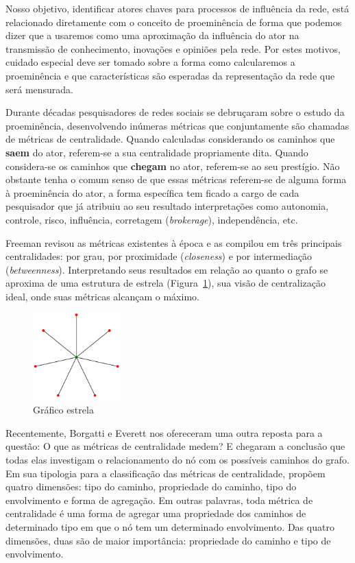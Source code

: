 \documentclass{article}
\begin{document}
Nosso objetivo, identificar atores chaves para processos de influência da rede,
está relacionado diretamente com o conceito de proeminência de forma que podemos
dizer que a usaremos como uma aproximação da influência do ator na transmissão de
conhecimento, inovações e opiniões pela rede. Por estes motivos, cuidado especial
deve ser tomado sobre a forma como calcularemos a proeminência e que
características são esperadas da representação da rede que será mensurada.

Durante décadas pesquisadores de redes sociais se debruçaram sobre o estudo da
proeminência, desenvolvendo inúmeras métricas que conjuntamente são chamadas de
métricas de centralidade. Quando calculadas considerando os caminhos que
\textbf{saem} do ator, referem-se a sua centralidade propriamente dita. Quando
considera-se os caminhos que \textbf{chegam} no ator, referem-se ao seu
prestígio. Não obstante tenha o comum senso de que essas métricas referem-se de
alguma forma à proeminência do ator, a forma específica tem ficado a cargo de
cada pesquisador que já atribuiu ao seu resultado interpretações como autonomia,
controle, risco, influência, corretagem (\textit{brokerage}), independência,
etc.

Freeman revisou as métricas existentes à época \cite{Freeman1979} e as compilou
em três principais centralidades: por grau, por proximidade (\textit{closeness})
e por intermediação (\textit{betweenness}). Interpretando seus resultados em
relação ao quanto o grafo se aproxima de uma estrutura de estrela
(Figura~\ref{fig:star}), sua visão de centralização ideal, onde suas métricas
alcançam o máximo.

\begin{figure}[h!]
  \caption{Gráfico estrela}
  \label{fig:star}
  \centering
    \includegraphics[width=0.3\textwidth]{imgs/star.png}
\end{figure}

Recentemente, Borgatti e Everett \cite{Borgatti2006} nos ofereceram uma
outra reposta para a questão: O que as métricas de centralidade medem? E
chegaram a conclusão que todas elas investigam o relacionamento do nó com os
possíveis caminhos do grafo. Em sua tipologia para a classificação das
métricas de centralidade, propõem quatro dimensões: tipo do caminho,
propriedade do caminho, tipo do envolvimento e forma de agregação. Em outras
palavras, toda métrica de centralidade é uma forma de agregar uma propriedade
dos caminhos de determinado tipo em que o nó tem um determinado envolvimento.
Das quatro dimensões, duas são de maior importância: propriedade do caminho e
tipo de envolvimento. 
\end{document}
